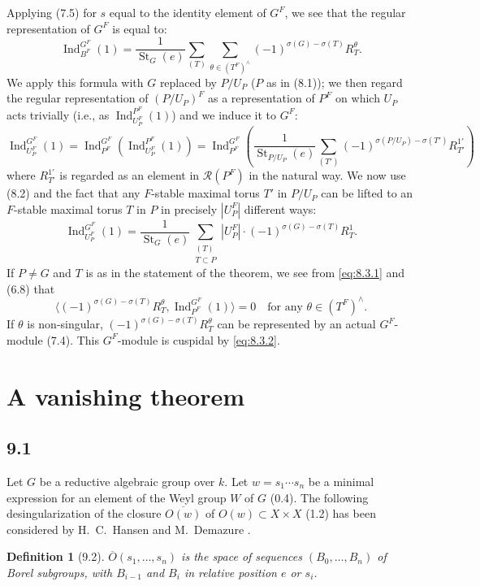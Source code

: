 \documentclass[11pt]{amsart}
\theoremstyle{plain}
\newtheorem{definition}[theorem]{Definition}
\theoremstyle{remark}
\DeclareMathOperator{\Ind}{Ind}
\DeclareMathOperator{\St}{St}
\begin{document}
Applying (7.5) for $s$ equal to the identity element of $G^F$, we see that the regular representation of $G^F$ is equal to:
\[
\Ind_{B^F}^{G^F}(1) = \frac{1}{\St_G(e)} \sum_{(T)} \sum_{\theta \in (T^F)^\wedge} (-1)^{\sigma(G) - \sigma(T)} R_T^\theta.
\]
We apply this formula with $G$ replaced by $P/U_P$ ($P$ as in (8.1)); we then regard the regular representation of $(P/U_P)^F$ as a representation of $P^F$ on which $U_P$ acts trivially (i.e., as $\Ind_{U_P^F}^{P^F}(1)$) and we induce it to $G^F$:
\[
\Ind_{U_P^F}^{G^F}(1) = \Ind_{P^F}^{G^F}(\Ind_{U_P^F}^{P^F}(1)) = \Ind_{P^F}^{G^F}\left(\frac{1}{\St_{P/U_P}(e)} \sum_{(T')} (-1)^{\sigma(P/U_P) - \sigma(T')} R_{T'}^{1'}\right)
\]
where $R_{T'}^{1'}$ is regarded as an element in $\mathcal{R}(P^F)$ in the natural way. We now use (8.2) and the fact that any $F$-stable maximal torus $T'$ in $P/U_P$ can be lifted to an $F$-stable maximal torus $T$ in $P$ in precisely $|U_P^F|$ different ways:
\begin{equation}\label{eq:8.3.1}
\Ind_{U_P^F}^{G^F}(1) = \frac{1}{\St_G(e)} \sum_{\substack{(T) \\ T \subset P}} |U_P^F| \cdot (-1)^{\sigma(G) - \sigma(T)} R_T^1.
\end{equation}
If $P \neq G$ and $T$ is as in the statement of the theorem, we see from \eqref{eq:8.3.1} and (6.8) that
\begin{equation}\label{eq:8.3.2}
\langle (-1)^{\sigma(G) - \sigma(T)} R_T^\theta, \Ind_{P^F}^{G^F}(1) \rangle = 0 \quad \text{for any } \theta \in (T^F)^\wedge.
\end{equation}
If $\theta$ is non-singular, $(-1)^{\sigma(G) - \sigma(T)} R_T^\theta$ can be represented by an actual $G^F$-module (7.4). This $G^F$-module is cuspidal by \eqref{eq:8.3.2}.

\section{A vanishing theorem}

\subsection{9.1} Let $G$ be a reductive algebraic group over $k$. Let $w = s_1 \cdots s_n$ be a minimal expression for an element of the Weyl group $W$ of $G$ (0.4). The following desingularization of the closure $\overline{O(w)}$ of $O(w) \subset X \times X$ (1.2) has been considered by H.\ C.\ Hansen \cite{Han} and M.\ Demazure \cite{Dem}.

\begin{definition}[9.2]
$\overline{O}(s_1, \dots, s_n)$ is the space of sequences $(B_0, \dots, B_n)$ of Borel subgroups, with $B_{i-1}$ and $B_i$ in relative position $e$ or $s_i$.
\end{definition}
\end{document}
